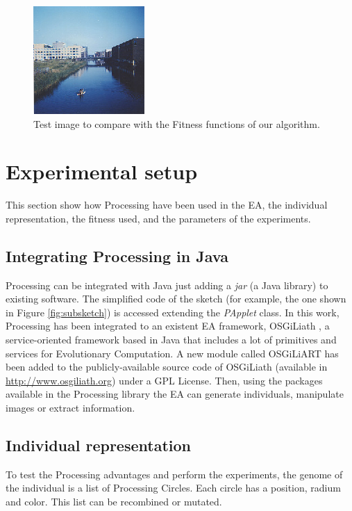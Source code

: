 \documentclass[conference]{IEEEtran}
\begin{document}
\begin{figure}
\centering
   \includegraphics[scale =3] {images/flevopark.eps}
\caption{Test image to compare with the Fitness functions of our algorithm.}
\label{fig:flevopark}
\end{figure}

\section{Experimental setup}
\label{sec:setup}

This section show how Processing have been used in the EA, the individual representation, the fitness used, and the parameters of the experiments.

\subsection{Integrating Processing in Java}
Processing can be integrated with Java just adding a {\em jar} (a Java library) to existing software. The simplified code of the sketch (for example, the one shown in Figure \ref{fig:subsketch}) is accessed extending the {\em PApplet} class. In this work, Processing has been integrated to an existent EA framework, OSGiLiath \cite{OSGILIATH}, a service-oriented framework based in Java that includes a lot of primitives and services for Evolutionary Computation. A new module called OSGiLiART has been added to the publicly-available source code of OSGiLiath (available in \url{http://www.osgiliath.org}) under a GPL License. Then, using the packages available in the Processing library the EA can generate individuals, manipulate images or extract information.

\subsection{Individual representation}

To test the Processing advantages and perform the experiments, the genome of the individual is a list of Processing Circles. Each circle has a position, radium and color. This list can be recombined or mutated.
\end{document}
